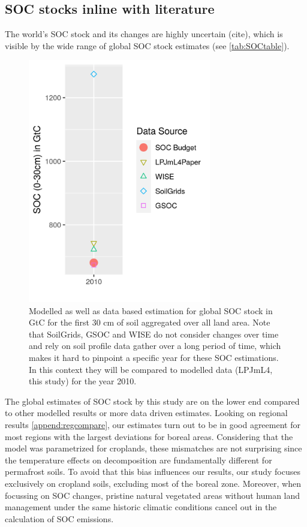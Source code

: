 \documentclass[gc, manuscript]{copernicus}
\begin{document}
\hypertarget{soc-stocks-inline-with-literature}{%
\subsection{SOC stocks inline with literature}\label{soc-stocks-inline-with-literature}}

The world's SOC stock and its changes are highly uncertain (cite), which is visible by the wide range of global SOC stock estimates (see \ref{tab:SOCtable}).

\begin{figure}[H]
\includegraphics[width=8cm]{../ResultNotebooks/Output/Images/glo_comparisonfigure} \caption{Modelled as well as data based estimation for global SOC stock in GtC for the first 30 cm of soil aggregated over all land area. Note that SoilGrids, GSOC and WISE do not consider changes over time and rely on soil profile data gather over a long period of time, which makes it hard to pinpoint a specific year for these SOC estimations. In this context they will be compared to modelled data (LPJmL4, this study) for the year 2010.}\label{fig:SOCtable}
\end{figure}

The global estimates of SOC stock by this study are on the lower end compared to other modelled results or more data driven estimates. Looking on regional results \ref{append:regcompare}, our estimates turn out to be in good agreement for most regions with the largest deviations for boreal areas. Considering that the model was parametrized for croplands, these mismatches are not surprising since the temperature effects on decomposition are fundamentally different for permafrost soils. To avoid that this bias influences our results, our study focuses exclusively on cropland soils, excluding most of the boreal zone. Moreover, when focussing on SOC changes, pristine natural vegetated areas without human land management under the same historic climatic conditions cancel out in the calculation of SOC emissions.
\end{document}
